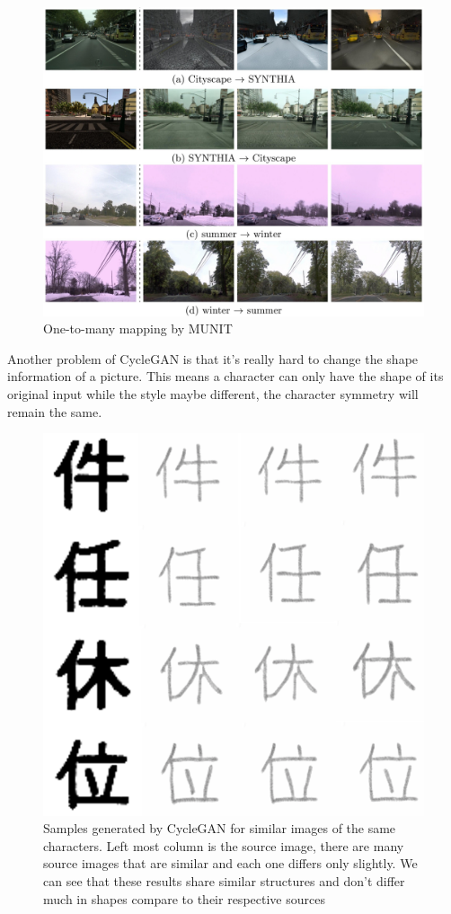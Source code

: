 \documentclass[12pt]{report}
\begin{document}
\begin{figure}[h]
	\centering
	\includegraphics[scale=0.2]{street-munit}
	\caption{One-to-many mapping by MUNIT\cite{munit}}
	\label{fig:street-munit}
\end{figure}

Another problem of CycleGAN is that it's really hard to change the shape information of a picture. This means a character can only have the shape of its original input while the style maybe different, the character symmetry will remain the same.

\begin{figure}[h]
	\centering
	\includegraphics[scale=0.9]{cycle-gan-result-2}
	\caption{Samples generated by CycleGAN for similar images of the same characters. Left most column is the source image, there are many source images that are similar and each one differs only slightly. We can see that these results share similar structures and don't differ much in shapes compare to their respective sources}
	\label{fig:cycle-gan-result-2}
\end{figure}
\end{document}

